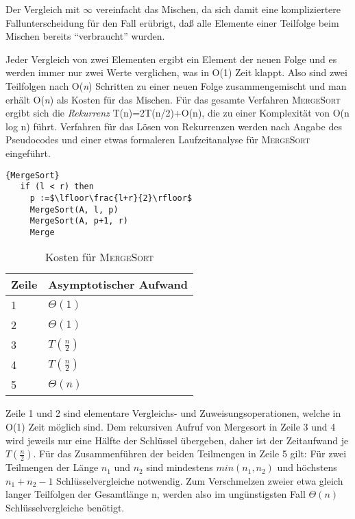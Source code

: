 \documentclass{scrreprt}%
\theoremstyle{break}
\begin{document}
Der Vergleich mit $\infty$ vereinfacht das Mischen, da sich damit eine kompliziertere Fallunterscheidung für den Fall erübrigt, 
daß alle Elemente einer Teilfolge beim Mischen bereits "`verbraucht"' wurden.

Jeder Vergleich von zwei Elementen ergibt ein Element der neuen Folge und es werden immer nur zwei Werte verglichen, was in
O(1) Zeit klappt. Also sind zwei Teilfolgen nach O(\textit{n}) Schritten zu einer neuen Folge zusammengemischt und man erhält
O(\textit{n}) als Kosten für das Mischen.
Für das gesamte Verfahren \textsc{MergeSort} ergibt sich die \textit{Rekurrenz} T(n)=2T(n/2)+O(n), die zu einer Komplexität von O(n
log n) führt. Verfahren für das Lösen von Rekurrenzen werden nach Angabe des Pseudocodes und einer etwas
formaleren Laufzeitanalyse für \textsc{MergeSort} eingeführt.

%
\begin{Algorithmus}[h]
    \begin{lstlisting}[frame=tlrb, mathescape=true, title=\textsc{MergeSort}, gobble=3]{MergeSort}   
   if (l < r) then
     p :=$\lfloor\frac{l+r}{2}\rfloor$ 
     MergeSort(A, l, p)
     MergeSort(A, p+1, r)
     Merge
    \end{lstlisting}
  \end{Algorithmus}
  
\begin{table}[h]
  \begin{tabular}{*{2}{l}}
    Zeile & Asymptotischer Aufwand\\
    \hline
    1 & $\Theta(1)$\\
    2 & $\Theta(1)$\\
    3 & $T(\frac{n}{2})$\\
    4 & $T(\frac{n}{2})$\\
    5 & $\Theta(n)$\\
  \end{tabular}
  \caption{Kosten für \textsc{MergeSort}} 
\end{table}

Zeile 1 und 2 sind elementare Vergleichs- und Zuweisungsoperationen, welche in O(1) Zeit möglich sind. 
Dem rekursiven Aufruf von Mergesort in Zeile 3 und 4 wird jeweils nur eine Hälfte der Schlüssel übergeben, 
daher ist der Zeitaufwand je $T(\frac{n}{2})$. Für das Zusammenführen der beiden Teilmengen in Zeile 5 gilt: 
Für zwei Teilmengen der Länge $n_1$ und $n_2$ sind mindestens $min(n_1,n_2)$ und höchstens $n_1 + n_2 -1$ Schlüsselvergleiche notwendig. 
Zum Verschmelzen zweier etwa gleich langer Teilfolgen der Gesamtlänge n, werden also im ungünstigsten Fall $\Theta(n)$ Schlüsselvergleiche benötigt.
\end{document}
